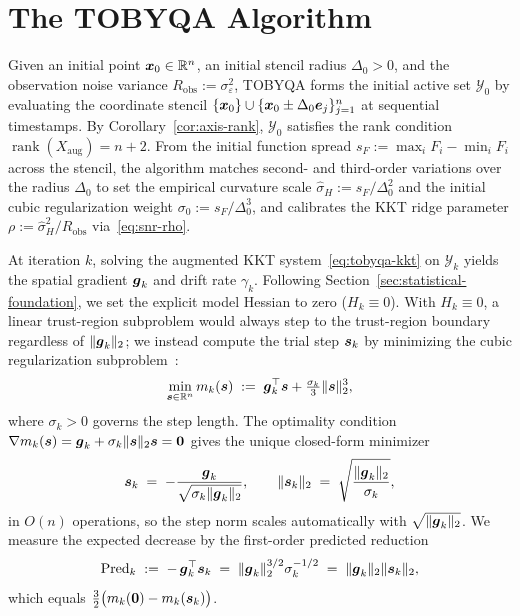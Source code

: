 \section{The TOBYQA Algorithm}
\label{sec:algorithm}

Given an initial point $\boldsymbol{x}_0 \in \mathbb{R}^n$, an initial stencil radius $\Delta_0 > 0$, and the observation noise variance $R_{\mathrm{obs}} := \sigma_\varepsilon^2$, TOBYQA forms the initial active set $\mathcal{Y}_0$ by evaluating the coordinate stencil $\{\boldsymbol{x}_0\} \cup \{\boldsymbol{x}_0 \pm \Delta_0 \boldsymbol{e}_j\}_{j=1}^n$ at sequential timestamps. By Corollary~\ref{cor:axis-rank}, $\mathcal{Y}_0$ satisfies the rank condition $\operatorname{rank}(X_{\mathrm{aug}}) = n+2$. From the initial function spread $s_F := \max_i F_i - \min_i F_i$ across the stencil, the algorithm matches second- and third-order variations over the radius $\Delta_0$ to set the empirical curvature scale $\widehat\sigma_H := s_F / \Delta_0^2$ and the initial cubic regularization weight $\sigma_0 := s_F / \Delta_0^3$, and calibrates the KKT ridge parameter $\rho := \widehat\sigma_H^2 / R_{\mathrm{obs}}$ via~\eqref{eq:snr-rho}.

At iteration $k$, solving the augmented KKT system~\eqref{eq:tobyqa-kkt} on $\mathcal{Y}_k$ yields the spatial gradient $\boldsymbol{g}_k$ and drift rate $\gamma_k$. Following Section~\ref{sec:statistical-foundation}, we set the explicit model Hessian to zero ($H_k \equiv 0$). With $H_k \equiv 0$, a linear trust-region subproblem would always step to the trust-region boundary regardless of $\|\boldsymbol{g}_k\|_2$; we instead compute the trial step $\boldsymbol{s}_k$ by minimizing the cubic regularization subproblem~\cite{CartisGouldToint2011ARC}:
\begin{equation*}
  \min_{\boldsymbol{s} \in \mathbb{R}^n} m_k(\boldsymbol{s}) \;:=\; \boldsymbol{g}_k^\top \boldsymbol{s} + \tfrac{\sigma_k}{3} \|\boldsymbol{s}\|_2^3,
\end{equation*}
where $\sigma_k > 0$ governs the step length. The optimality condition $\nabla m_k(\boldsymbol{s}) = \boldsymbol{g}_k + \sigma_k \|\boldsymbol{s}\|_2 \boldsymbol{s} = \boldsymbol{0}$ gives the unique closed-form minimizer
\begin{equation}\label{eq:closed-form-step}
  \boldsymbol{s}_k \;=\; -\frac{\boldsymbol{g}_k}{\sqrt{\sigma_k \|\boldsymbol{g}_k\|_2}},
  \qquad
  \|\boldsymbol{s}_k\|_2 \;=\; \sqrt{\frac{\|\boldsymbol{g}_k\|_2}{\sigma_k}},
\end{equation}
in $O(n)$ operations, so the step norm scales automatically with $\sqrt{\|\boldsymbol{g}_k\|_2}$. We measure the expected decrease by the first-order predicted reduction
\begin{equation}\label{eq:pred-def}
  \mathrm{Pred}_k \;:=\; -\,\boldsymbol{g}_k^{\top} \boldsymbol{s}_k \;=\; \|\boldsymbol{g}_k\|_2^{3/2} \sigma_k^{-1/2} \;=\; \|\boldsymbol{g}_k\|_2 \|\boldsymbol{s}_k\|_2,
\end{equation}
which equals $\tfrac{3}{2}\bigl(m_k(\boldsymbol{0}) - m_k(\boldsymbol{s}_k)\bigr)$.

